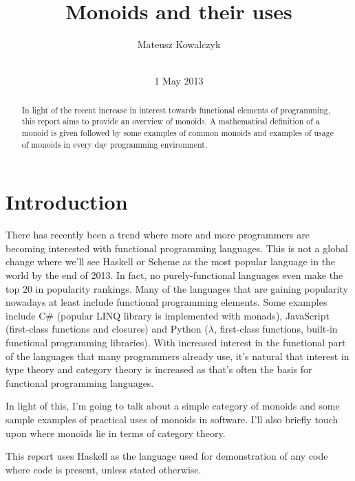 \documentclass{acm_proc_article-sp}
\begin{document}
\title{Monoids and their uses}
\author{
\alignauthor
Mateusz Kowalczyk\\
       \\
}

\date{1 May 2013}

\maketitle
\begin{abstract}
In light of the recent increase in interest towards functional
elements of programming, this report aims to provide an overview of
monoids. A mathematical definition of a monoid is given followed by
some examples of common monoids and examples of usage of monoids in
every day programming environment.
\end{abstract}


\section{Introduction}
There has recently been a trend where more and more programmers are
becoming interested with functional programming languages. This is not
a global change where we'll see Haskell or Scheme as the most popular
language in the world by the end of 2013. In fact, no
purely-functional languages even make the top 20 in popularity
rankings\cite{tiobe:rankings}. Many of the languages that are gaining
popularity nowadays at least include functional programming
elements. Some examples include C\# (popular LINQ library is
implemented with monads), JavaScript (first-class functions and
closures) and Python ($\lambda$, first-class functions, built-in
functional programming libraries\cite{python:itertools}). With
increased interest in the functional part of the languages that many
programmers already use, it's natural that interest in type theory and
category theory is increased as that's often the basis for functional
programming languages.

In light of this, I'm going to talk about a simple category of monoids
and some sample examples of practical uses of monoids in
software. I'll also briefly touch upon where monoids lie in terms of
category theory.

This report uses Haskell as the language used for demonstration of any
code where code is present, unless stated otherwise.
\end{document}
